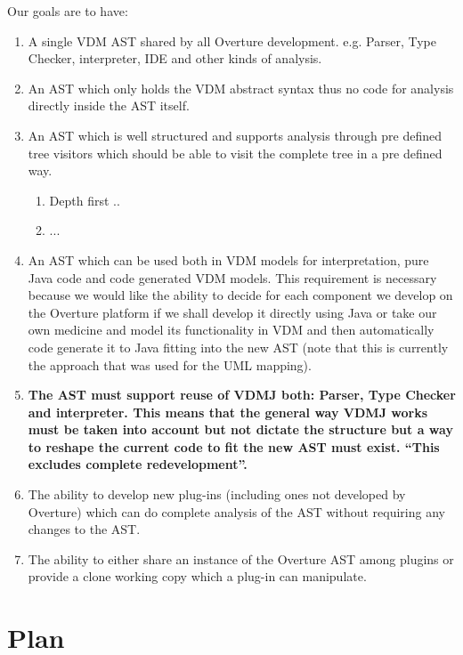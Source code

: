 \documentclass{overturerep}
\begin{document}
Our goals are to have:
\begin{enumerate}
\item A single VDM AST shared by all Overture
  development. e.g. Parser, Type Checker, interpreter, IDE and other
  kinds of analysis.
\item An AST which only holds the VDM abstract syntax thus no code for
  analysis directly inside the AST itself.
\item An AST which is well structured and supports analysis through
  pre defined tree visitors which should be able to visit the complete tree in a pre defined way.
\begin{enumerate}
\item Depth first ..
\item ...
\end{enumerate}
\item An AST which can be used both in VDM models for interpretation,
  pure Java code and code generated VDM models. This requirement is
  necessary because we would like the ability to decide for each
  component we develop on the Overture platform if we shall develop it
  directly using Java or take our own medicine and model its
  functionality in VDM and then automatically code generate it to Java
  fitting into the new AST (note that this is currently the approach
  that was used for the UML mapping).

\item \textbf{The AST must support reuse of VDMJ both: Parser, Type Checker and interpreter. This means that the general way VDMJ works must be taken into account but not dictate the structure but a way to reshape the current code to fit the new AST must exist. ``This excludes complete redevelopment''.}
\item The ability to develop new plug-ins (including ones not developed by Overture) which can do complete analysis of the AST without requiring any changes to the AST.
\item The ability to either share an instance of the Overture AST among plugins or provide a clone working copy which a plug-in can manipulate.
\end{enumerate}

\section{Plan}
\end{document}
